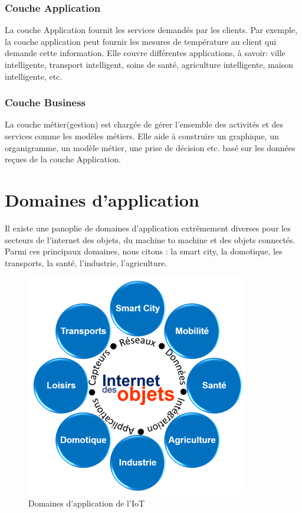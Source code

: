 	\subsubsection{Couche Application}
La couche Application fournit les services demandés par les clients. Par exemple, la couche application peut fournir les mesures de température au client qui demande cette information.
Elle couvre dif{\kern0pt}férentes applications, à savoir: ville intelligente, transport intelligent, soins de santé, agriculture intelligente, maison intelligente, etc.
	\subsubsection{Couche Business}
La couche métier(gestion) est chargée de gérer l’ensemble des activités et des services comme les modèles métiers. Elle aide à construire un graphique, un organigramme, un modèle métier, une prise de décision etc. basé sur les données reçues de la couche Application.
	\section*{Domaines d’application}
Il existe une panoplie de domaines d’application extrêmement diverses pour les secteurs de l’internet des objets, du machine to machine et des objets connectés. Parmi ces principaux domaines, nous citons : la smart city, la domotique, les transports, la santé, l’industrie, l’agriculture.
	\begin{figure}[H]
		\begin{center}
			\includegraphics{IMAGES/ORIGINALS/Application_IoT}
		\end{center}
		\caption{Domaines d'application de l'IoT}
	\end{figure}
